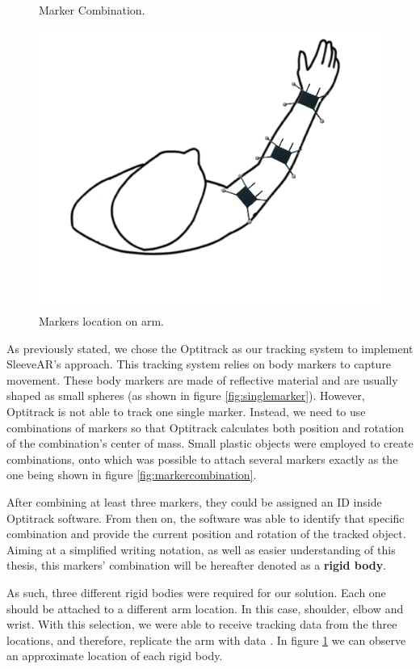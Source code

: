 \begin{figure}
    \caption{Marker Combination.}
    \label{fig:markercombination}
    \endminipage\hfill
{}
  \centering
  \includegraphics[width=\linewidth]{imgs/impl/rigidbodiesattached}
    \caption{Markers location on arm.}
    \label{fig:rigidbodiesattached}
    \endminipage
\end{figure}


As previously stated, we chose the Optitrack as our tracking system to implement SleeveAR's approach. This tracking system relies on body markers to capture movement.
These body markers are made of reflective material and are usually shaped as small spheres (as shown in figure \ref{fig:singlemarker}).
However, Optitrack is not able to track one single marker. Instead, we need to use combinations of markers so that Optitrack calculates both 
position and rotation of the combination's center of mass. 
Small plastic objects were employed to create combinations, onto which was possible to attach several markers exactly as the one being shown in figure \ref{fig:markercombination}.

After combining at least three markers, they could be assigned an ID inside Optitrack software. 
From then on, the software was able to identify that specific combination and provide the current position and rotation of the tracked object. Aiming at a simplified writing notation, as well as easier understanding of this thesis, this markers' combination will be hereafter denoted as a \textbf{rigid body}.

As such, three different rigid bodies were required for our solution. Each one should be attached to a different arm location. In this case, shoulder, elbow and wrist. 
With this selection, we were able to receive tracking data from the three locations, and therefore, replicate the arm with data . In figure \ref{fig:rigidbodiesattached} we can observe
an approximate location of each rigid body.

